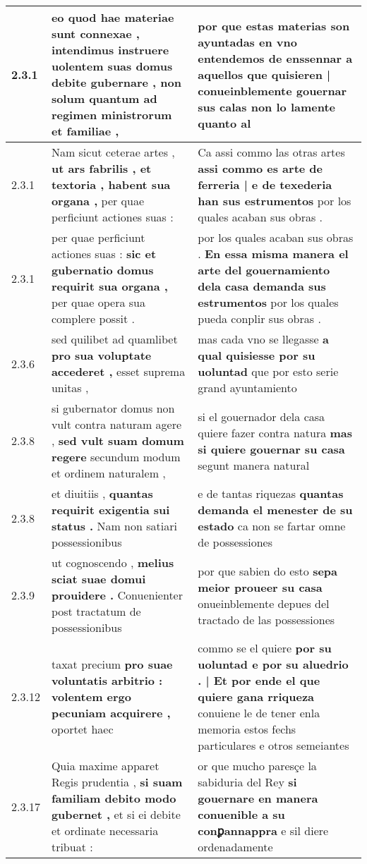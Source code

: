 \begin{tabular}{|p{1cm}|p{6.5cm}|p{6.5cm}|}
2.3.1 & eo quod hae materiae sunt connexae , \textbf{ intendimus instruere uolentem suas domus debite gubernare , } non solum quantum ad regimen ministrorum et familiae , & por que estas materias son ayuntadas en vno entendemos de enssennar \textbf{ a aquellos que quisieren | conueinblemente gouernar sus calas } non lo lamente quanto al \\\hline
2.3.1 & Nam sicut ceterae artes , \textbf{ ut ars fabrilis , et textoria , habent sua organa , } per quae perficiunt actiones suas : & Ca assi commo las otras artes \textbf{ assi commo es arte de ferreria | e de texederia han sus estrumentos } por los quales acaban sus obras . \\\hline
2.3.1 & per quae perficiunt actiones suas : \textbf{ sic et gubernatio domus requirit sua organa , } per quae opera sua complere possit . & por los quales acaban sus obras . \textbf{ En essa misma manera el arte del gouernamiento dela casa demanda sus estrumentos } por los quales pueda conplir sus obras . \\\hline
2.3.6 & sed quilibet ad quamlibet \textbf{ pro sua voluptate accederet , } esset suprema unitas , & mas cada vno se llegasse \textbf{ a qual quisiesse por su uoluntad } que por esto serie grand ayuntamiento \\\hline
2.3.8 & si gubernator domus non vult contra naturam agere , \textbf{ sed vult suam domum regere } secundum modum et ordinem naturalem , & si el gouernador dela casa quiere fazer contra natura \textbf{ mas si quiere gouernar su casa } segunt manera natural \\\hline
2.3.8 & et diuitiis , \textbf{ quantas requirit exigentia sui status . } Nam non satiari possessionibus & e de tantas riquezas \textbf{ quantas demanda el menester de su estado } ca non se fartar omne de possessiones \\\hline
2.3.9 & ut cognoscendo , \textbf{ melius sciat suae domui prouidere . } Conuenienter post tractatum de possessionibus & por que sabien do esto \textbf{ sepa meior proueer su casa } onueinblemente depues del tractado de las possessiones \\\hline
2.3.12 & taxat precium \textbf{ pro suae voluntatis arbitrio : volentem ergo pecuniam acquirere , } oportet haec & commo se el quiere \textbf{ por su uoluntad e por su aluedrio . | Et por ende el que quiere gana rriqueza } conuiene le de tener enla memoria estos fechs particulares e otros semeiantes \\\hline
2.3.17 & Quia maxime apparet Regis prudentia , \textbf{ si suam familiam debito modo gubernet , } et si ei debite et ordinate necessaria tribuat : & or que mucho paresçe la sabiduria del Rey \textbf{ si gouernare en manera conuenible a su conꝑannappra } e sil diere ordenadamente \\\hline

\end{tabular}
